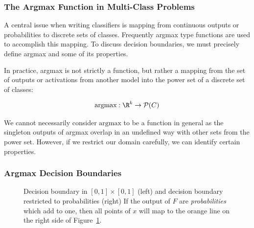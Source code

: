 \begin{frame}
  \frametitle{The Argmax Function in Multi-Class Problems}

 A central issue when writing classifiers is mapping from continuous outputs or probabilities to discrete sets of classes. Frequently argmax type functions are used to accomplish this mapping. To discuss decision boundaries, we must precisely define argmax and some of its properties. 

 In practice, argmax is not strictly a function, but rather a mapping from the set of outputs or activations from another model into the power set of a discrete set of classes:

 \begin{equation}
     \text{argmax} : \R^k \to \mathcal{P}(C)
 \end{equation}

 We cannot necessarily consider $\text{argmax}$ to be a function in general as the singleton outputs of argmax overlap in an undefined way with other sets from the power set. However, if we restrict our domain carefully, we can identify certain properties. 
\end{frame}
\begin{frame}
  \frametitle{Argmax Decision Boundaries }
 \begin{figure}[!ht]
\begin{center}


 \caption{Decision boundary in $[0,1] \times [0,1]$ (left) and decision boundary restricted to probabilities (right) If the output of $F$ are \emph{probabilities} which add to one, then all points of $x$ will map to the orange line on the right side of Figure~\ref{fig:pdb}. }
 \label{fig:pdb}
 \end{center}
 \end{figure}
\end{frame}
